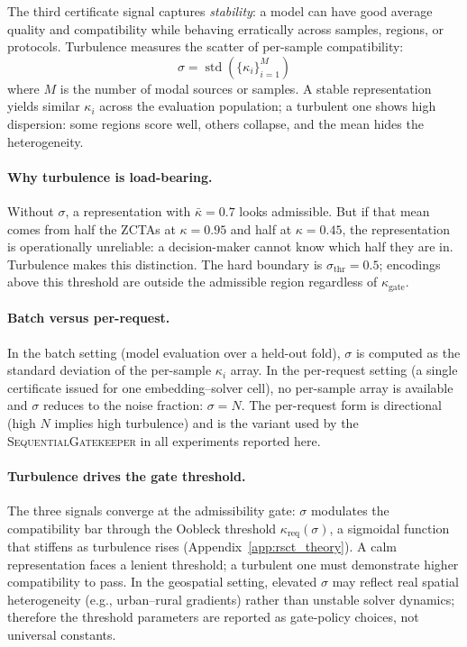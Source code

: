 \documentclass{article}
\begin{document}
The third certificate signal captures \emph{stability}: a model can have good average quality and compatibility while behaving erratically across samples, regions, or protocols. Turbulence measures the scatter of per-sample compatibility:
\begin{equation}
\sigma = \operatorname{std}(\{\kappa_i\}_{i=1}^M)
\end{equation}
where $M$ is the number of modal sources or samples. A stable representation yields similar $\kappa_i$ across the evaluation population; a turbulent one shows high dispersion: some regions score well, others collapse, and the mean hides the heterogeneity.

\paragraph{Why turbulence is load-bearing.} Without $\sigma$, a representation with $\bar{\kappa} = 0.7$ looks admissible. But if that mean comes from half the ZCTAs at $\kappa = 0.95$ and half at $\kappa = 0.45$, the representation is operationally unreliable: a decision-maker cannot know which half they are in. Turbulence makes this distinction. The hard boundary is $\sigma_{\text{thr}} = 0.5$; encodings above this threshold are outside the admissible region regardless of $\kappa_{\text{gate}}$.

\paragraph{Batch versus per-request.} In the batch setting (model evaluation over a held-out fold), $\sigma$ is computed as the standard deviation of the per-sample $\kappa_i$ array. In the per-request setting (a single certificate issued for one embedding--solver cell), no per-sample array is available and $\sigma$ reduces to the noise fraction: $\sigma = N$. The per-request form is directional (high $N$ implies high turbulence) and is the variant used by the \textsc{SequentialGatekeeper} in all experiments reported here.

\paragraph{Turbulence drives the gate threshold.} The three signals converge at the admissibility gate: $\sigma$ modulates the compatibility bar through the Oobleck threshold $\kappa_{\text{req}}(\sigma)$, a sigmoidal function that stiffens as turbulence rises (Appendix~\ref{app:rsct_theory}). A calm representation faces a lenient threshold; a turbulent one must demonstrate higher compatibility to pass. In the geospatial setting, elevated $\sigma$ may reflect real spatial heterogeneity (e.g., urban--rural gradients) rather than unstable solver dynamics; therefore the threshold parameters are reported as gate-policy choices, not universal constants.
\end{document}
